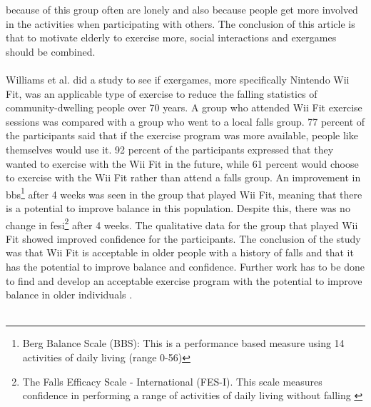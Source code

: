 because of this group often are lonely and also because people get more involved in the activities when participating with others. The conclusion of this article is that to motivate elderly to exercise more, social interactions and exergames should be combined.\cite{exergamesforelderly} \\ \\
Williams et al. \cite{excell} did a study to see if exergames, more specifically Nintendo Wii Fit, was an applicable type of exercise to reduce the falling statistics of community-dwelling people over 70 years. A group who attended Wii Fit exercise sessions was compared with a group who went to a local falls group. 77 percent of the participants said that if the exercise program was more available, people like themselves would use it. 92 percent of the participants expressed that they wanted to exercise with the Wii Fit in the future, while 61 percent would choose to exercise with the Wii Fit rather than attend a falls group. An improvement in \ac{bbs}\footnote{Berg Balance Scale (BBS): This is a performance based measure using 14 activities of daily living (range 0-56)\cite{excell}} after 4 weeks was seen in the group that played Wii Fit, meaning that there is a potential to improve balance in this population. Despite this, there was no change in \ac{fesi}\footnote{The Falls Efficacy Scale - International (FES-I). This scale measures confidence in performing a range of activities of daily living without falling \cite{fes}} after 4 weeks. The qualitative data for the group that played Wii Fit showed improved confidence for the participants. The conclusion of the study was that Wii Fit is acceptable in  older people with a history of falls and that it has the potential to improve balance and confidence. Further work has to be done to find and develop an acceptable exercise program with the potential to improve balance in older individuals \cite{excell}.\\ \\
